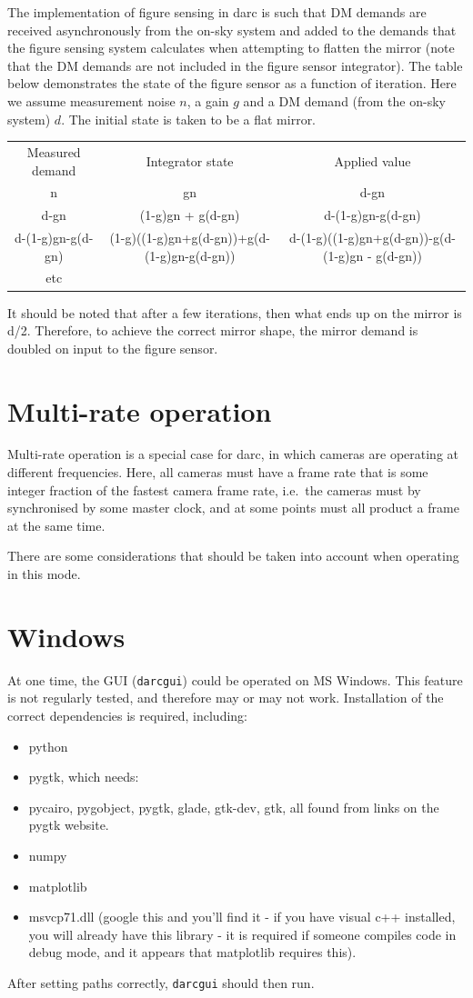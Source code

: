 \documentclass[a4,10pt]{article}
\begin{document}
The implementation of figure sensing in darc is such that DM demands
are received asynchronously from the on-sky system and added to the
demands that the figure sensing system calculates when attempting to
flatten the mirror (note that the DM demands are not included in the
figure sensor integrator).  The table below demonstrates the state of
the figure sensor as a function of iteration.  Here we assume
measurement noise $n$, a gain $g$ and a DM demand (from the on-sky
system) $d$.  The initial state is taken to be a flat mirror.

\begin{tabular}{ccc}
Measured demand & Integrator state & Applied value \\
n & gn & d-gn\\
d-gn & (1-g)gn + g(d-gn) & d-(1-g)gn-g(d-gn)\\
d-(1-g)gn-g(d-gn) & (1-g)((1-g)gn+g(d-gn))+g(d-(1-g)gn-g(d-gn)) & d-(1-g)((1-g)gn+g(d-gn))-g(d-(1-g)gn - g(d-gn))\\
etc &&\\
\end{tabular}

It should be noted that after a few iterations, then what ends up on
the mirror is d/2.  Therefore, to achieve the correct mirror shape,
the mirror demand is doubled on input to the figure sensor.

\section{Multi-rate operation}
Multi-rate operation is a special case for darc, in which cameras are
operating at different frequencies.  Here, all cameras must have a
frame rate that is some integer fraction of the fastest camera frame
rate, i.e.\ the cameras must by synchronised by some master clock, and
at some points must all product a frame at the same time.

There are some considerations that should be taken into account when
operating in this mode.

\section{Windows}
At one time, the GUI ({\tt darcgui}) could be operated on MS Windows.
This feature is not regularly tested, and therefore may or may not work.
Installation of the correct dependencies is required, including:
\begin{itemize}
\item python
\item pygtk, which needs:
\item pycairo, pygobject, pygtk, glade, gtk-dev, gtk, all found from links
on the pygtk website.
\item numpy
\item matplotlib
\item msvcp71.dll (google this and you'll find it - if you have visual c++
installed, you will already have this library - it is required if
someone compiles code in debug mode, and it appears that matplotlib
requires this).
\end{itemize}
After setting paths correctly, {\tt darcgui} should then run.
\end{document}
